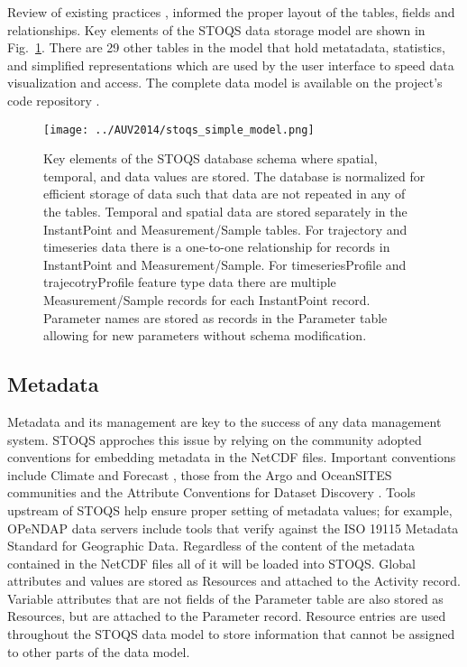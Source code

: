 \documentclass[conference]{IEEEtran}
\begin{document}
Review of existing practices \cite{Wright}, \cite{MODB} informed the proper layout 
of the tables, fields and relationships.  Key elements of the STOQS data storage model 
are shown in Fig.~\ref{fig:stoqs_simple_model}. There are 29 other tables in the model 
that hold metatadata, statistics, and simplified representations which are used by 
the user interface to speed data visualization and access. The complete data model 
is available on the project's code repository \cite{stoqs_github}. 

\begin{figure}[htbp]
\centering
\texttt{[image: ../AUV2014/stoqs\_simple\_model.png]}
\caption{Key elements of the STOQS database schema where spatial, temporal, and data 
values are stored. The database is normalized for efficient storage of data such 
that data are not repeated in any of the tables. Temporal and spatial data are stored 
separately in the InstantPoint and Measurement/Sample tables. For trajectory and 
timeseries data there is a one-to-one relationship for records in InstantPoint and 
Measurement/Sample. For timeseriesProfile and trajecotryProfile feature type data 
there are multiple Measurement/Sample records for each InstantPoint record. 
Parameter names are stored as records in the Parameter table allowing for new 
parameters without schema modification.}
\label{fig:stoqs_simple_model}
\end{figure}

\subsection{Metadata}

Metadata and its management are key to the success of any data management system. 
STOQS approches this issue by relying on the community adopted conventions for 
embedding metadata in the NetCDF files. Important conventions include Climate and 
Forecast \cite{CF}, those from the Argo and OceanSITES communities \cite{Pouliquen2006} 
and the Attribute Conventions for Dataset Discovery \cite{ACDD}. Tools upstream 
of STOQS help ensure proper setting of metadata values; for example, OPeNDAP data 
servers include tools that verify against the ISO 19115 Metadata Standard for 
Geographic Data. Regardless of the content of the metadata contained in the NetCDF 
files all of it will be loaded into STOQS. Global attributes and values are stored 
as Resources and attached to the Activity record. Variable attributes that are not 
fields of the Parameter table are also stored as Resources, but are attached to the 
Parameter record. Resource entries are used throughout the STOQS data model to store 
information that cannot be assigned to other parts of the data model.
\end{document}
